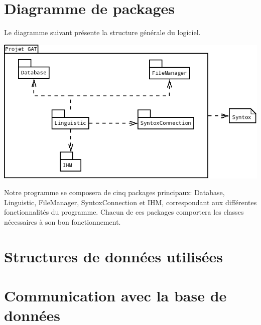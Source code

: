 \documentclass[12pt]{report}
\begin{document}
	



\section{Diagramme de packages}
Le diagramme suivant présente la structure générale du logiciel.

\begin{center}
\includegraphics[scale=0.45]{DiagPackages.png}
\end{center}


Notre programme se composera de cinq packages principaux: Database, Linguistic, FileManager, SyntoxConnection et IHM, correspondant aux différentes fonctionnalités du programme.
Chacun de ces packages comportera les classes nécessaires à son bon fonctionnement.





\section{Structures de données utilisées}

\section{Communication avec la base de données}
\end{document}
